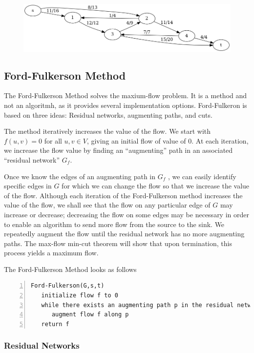 \begin{figure}[H]
\centering
\includegraphics[scale=0.45]{images/max_flow_01.png}
\end{figure}


\subsection{Ford-Fulkerson Method}

The Ford-Fulkerson Method solves the maxium-flow problem. It is a method and not an algoritmh, as it provides several implementation options. Ford-Fulkeron is based on three ideas: Residual networks, augmenting paths, and cuts.

The method iteratively increases the value of the flow. We start with $f(u,v)=0$ for all $u,v \in V$, giving an initial flow of value of $0$. At each iteration, we increase the flow value by finding an ``augmenting'' path in an associated ``residual network'' $G_f$.

Once we know the edges of an augmenting path in $G_f$ , we can easily identify speciﬁc edges in $G$ for which we can change the ﬂow so that we increase the value of the ﬂow. Although each iteration of the Ford-Fulkerson method increases the value of the ﬂow, we shall see that the ﬂow on any particular edge of $G$ may increase or decrease; decreasing the ﬂow on some edges may be necessary in order to enable an algorithm to send more ﬂow from the source to the sink. We repeatedly augment the ﬂow until the residual network has no more augmenting paths. The max-ﬂow min-cut theorem will show that upon termination, this process yields a maximum ﬂow.

The Ford-Fulkerson Method looks as follows

\begin{Verbatim}[numbers=left, xleftmargin=5mm]
Ford-Fulkerson(G,s,t)
   initialize flow f to 0
   while there exists an augmenting path p in the residual network G_f
      augment flow f along p
   return f
\end{Verbatim}


\subsubsection{Residual Networks}

